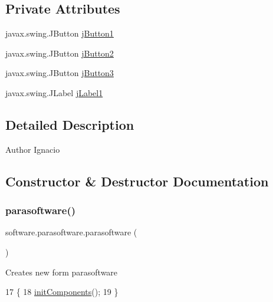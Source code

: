 \subsection*{Private Attributes}
\begin{DoxyCompactItemize}
\item 
javax.\+swing.\+J\+Button \mbox{\hyperlink{classsoftware_1_1parasoftware_a38e0fa900147742a3d209603a3289f14}{j\+Button1}}
\item 
javax.\+swing.\+J\+Button \mbox{\hyperlink{classsoftware_1_1parasoftware_a2d756706685fceab8e8cc24f7aece0bf}{j\+Button2}}
\item 
javax.\+swing.\+J\+Button \mbox{\hyperlink{classsoftware_1_1parasoftware_a4e3c086e2257863c3de29e92e6f8f027}{j\+Button3}}
\item 
javax.\+swing.\+J\+Label \mbox{\hyperlink{classsoftware_1_1parasoftware_a1478f501551ec89939b3b5f30a7d3181}{j\+Label1}}
\end{DoxyCompactItemize}


\subsection{Detailed Description}
\begin{DoxyAuthor}{Author}
Ignacio 
\end{DoxyAuthor}


\subsection{Constructor \& Destructor Documentation}
\mbox{\label{classsoftware_1_1parasoftware_aee631de1591fd8804c777c8beab9064e}} 
\subsubsection{\texorpdfstring{parasoftware()}{parasoftware()}}
{\footnotesize\ttfamily software.\+parasoftware.\+parasoftware (\begin{DoxyParamCaption}{ }\end{DoxyParamCaption})\hspace{0.3cm}{\ttfamily [inline]}}

Creates new form parasoftware 
\begin{DoxyCode}
17                           \{
18         \mbox{\hyperlink{classsoftware_1_1parasoftware_a485d53980d60034cc879c27abd275f6f}{initComponents}}();
19     \}
\end{DoxyCode}


